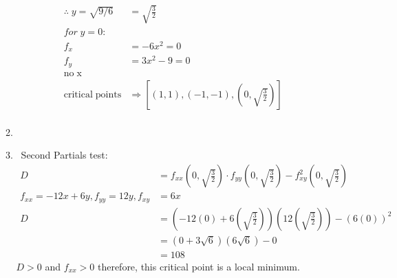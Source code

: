 \documentclass[11pt]{article}
\newcommand\Item[1][]{%
  \ifx\relax#1\relax  \item \else \item[#1] \fi
  \abovedisplayskip=0pt\abovedisplayshortskip=0pt~\vspace*{-\baselineskip}}
\begin{document}
\begin{preview}
\begin{enumerate}
\begin{enumerate}
\begin{align*}
                      \therefore \; y = \sqrt{9/6}     & = \sqrt{\frac{3}{2}}                                 \\
                      for \; y=0:                                                                             \\
                      f_x                              & = -6x^2 = 0                                          \\
                      f_y                              & = 3x^2 - 9 = 0                                       \\
                      \mathrm{no \; x}                                                                        \\
                      \mathrm{critical \; points}      & \Rightarrow [(1,1), (-1,-1), (0,\sqrt{\frac{3}{2}})] \\
                  \end{align*}
                  \Item Second Partials test:
                  \begin{align*}
                      D                                        & = f_{xx}(0,\sqrt{\frac{3}{2}}) \cdot f_{yy}(0,\sqrt{\frac{3}{2}}) - f^2_{xy}(0,\sqrt{\frac{3}{2}}) \\
                      f_{xx} = -12x + 6y, f_{yy} = 12y, f_{xy} & = 6x                                                                                               \\
                      D                                        & = (-12(0) + 6\left(\sqrt{\frac{3}{2}}\right))(12\left(\sqrt{\frac{3}{2}}\right)) - (6(0))^2        \\
                                                               & = (0 + 3\sqrt{6})(6\sqrt{6})-0                                                                     \\
                                                               & =    108
                  \end{align*}
                  $D>0$ and $f_{xx} > 0$ therefore, this critical point is a local minimum.
              \end{enumerate}


\end{enumerate}
\end{preview}
\end{document}
